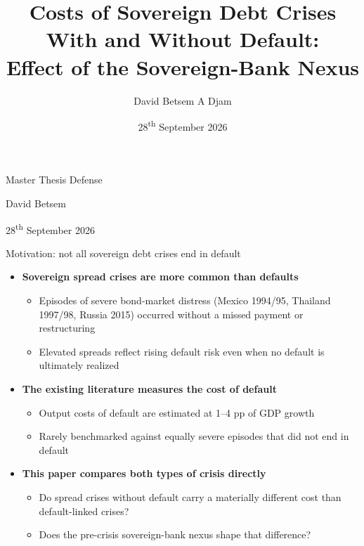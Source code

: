 \documentclass[aspectratio=169]{beamer}
\title{\large Costs of Sovereign Debt Crises With and Without Default:\\
Effect of the Sovereign-Bank Nexus}
\author{\normalsize David Betsem A Djam}
\institute{%
  \footnotesize
  HEC Paris, Institut Polytechnique de Paris
}
\date{\normalsize 28\textsuperscript{th} September 2026}
\begin{document}
{
\begin{frame}[plain]
  \vspace{0.8cm}
  \vfill
  \begin{center}
    \normalsize Master Thesis Defense\par
  \end{center}

  \begin{center}
  \end{center}
  \vspace{0.2cm}
  \begin{center}
    \large David Betsem\par
  \end{center}
  \vspace{0.6em}
  \begin{center}
    \small 28\textsuperscript{th} September 2026\par
  \end{center}
  \vfill
\end{frame}
}

\begin{frame}{Motivation: not all sovereign debt crises end in default}
  \begin{itemize}
    \item \textbf{Sovereign spread crises are more common than defaults}
    \begin{itemize}
      \item Episodes of severe bond-market distress (Mexico 1994/95, Thailand
      1997/98, Russia 2015) occurred without a missed payment or restructuring
      \item Elevated spreads reflect rising default risk even when no default
      is ultimately realized \citep{arellano2008default}
    \end{itemize}
    \item \textbf{The existing literature measures the cost of default}
    \begin{itemize}
      \item Output costs of default are estimated at 1--4 pp of GDP growth
      \item Rarely benchmarked against equally severe episodes that did not
      end in default
    \end{itemize}
    \item \textbf{This paper compares both types of crisis directly}
    \begin{itemize}
      \item Do spread crises without default carry a materially different
      cost than default-linked crises?
      \item Does the pre-crisis sovereign-bank nexus shape that difference?
    \end{itemize}
  \end{itemize}
\end{frame}
\end{document}
